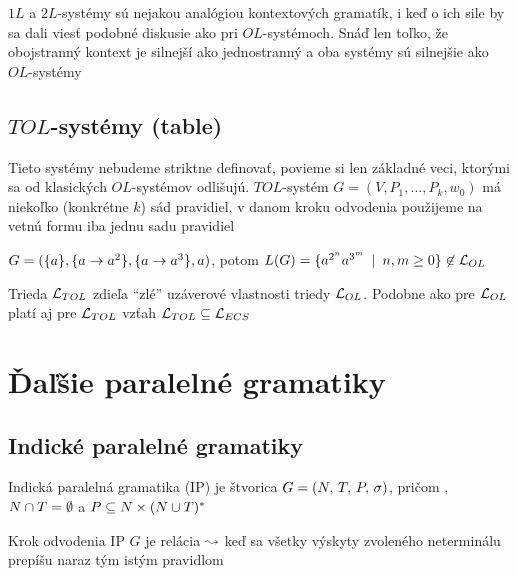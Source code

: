 \begin{poznamka}
  $1L$ a $2L$-systémy sú nejakou analógiou kontextových gramatík, i
  keď o ich sile by sa dali viesť podobné diskusie ako pri
  $OL$-systémoch. Snáď len toľko, že obojstranný kontext je silnejší
  ako jednostranný a oba systémy sú silnejšie ako $OL$-systémy
\end{poznamka}

\subsection{$TOL$-systémy (table)}

Tieto systémy nebudeme striktne definovať, povieme si len základné
veci, ktorými sa od kla\-sic\-kých $OL$-systémov odlišujú.
$TOL$-systém $G=(V,P_{1},\dots,P_{k},w_{0})$ má niekoľko
(konkrétne $k$) sád pravidiel, v danom kroku odvodenia použijeme
na vetnú formu iba jednu sadu pravidiel

\begin{priklad}
  $G=(\{a\},\{a\rightarrow a^{2}\},\{a\rightarrow a^{3}\},a)$, potom
  $L(G)=\{a^{2^{n}}a^{3^{m}}\enspace |\enspace n,m\geq0\}\not\in \mathcal{L}_{OL}$
\end{priklad}

\begin{poznamka}
  Trieda $\mathcal{L}_{TOL}$ zdieľa ``zlé'' uzáverové vlastnosti
  triedy $\mathcal{L}_{OL}$. Podobne ako pre $\mathcal{L}_{OL}$
  platí aj pre $\mathcal{L}_{TOL}$ vzťah
  $\mathcal{L}_{TOL} \subseteq \mathcal{L}_{ECS}$
\end{poznamka}

\section{Ďaľšie paralelné gramatiky}

\subsection{Indické paralelné gramatiky}

\begin{definicia}
  Indická paralelná gramatika (IP) je štvorica
  $G = (N,\,T,\,P,\,\sigma)$,
  pričom , $N \cap T = \emptyset$
  a $P \subseteq N \times(N \cup T)^{*}$
\end{definicia}

\begin{definicia}
  Krok odvodenia IP $G$ je relácia $\leadsto$ keď sa všetky výskyty
  zvoleného neterminálu prepíšu naraz tým istým pravidlom
\end{definicia}

